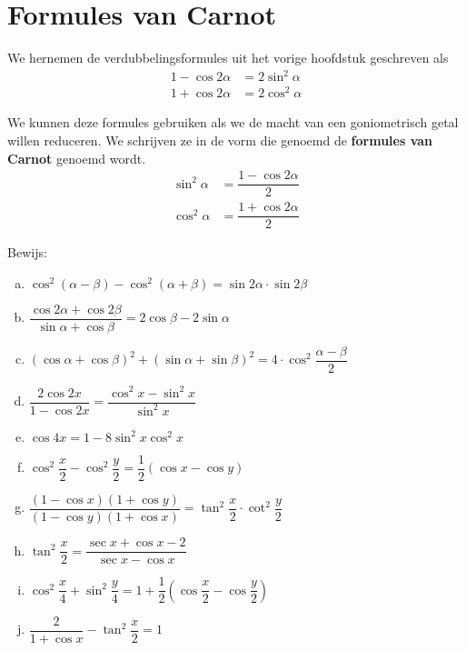 \documentclass[twoside,a4paper,12pt]{article}
\begin{document}
\cleardoublepage
\section{Formules van Carnot}

We hernemen de verdubbelingsformules uit het vorige hoofdstuk geschreven als
\begin{align*}
  1 - \cos 2\alpha &= 2\sin^2\alpha\\
  1 + \cos 2\alpha &= 2\cos^2\alpha
\end{align*}

We kunnen deze formules gebruiken als we de macht van een goniometrisch getal willen reduceren. We schrijven ze in de vorm die genoemd de {\bf formules van Carnot} genoemd wordt.
\begin{align*}
  \sin^2\alpha &= \dfrac{1 - \cos 2\alpha}{2}\\
  \cos^2\alpha &= \dfrac{1 + \cos 2\alpha}{2}
\end{align*}

\begin{oefening} %
Bewijs:
\begin{enumerate}[(a)]
  \itemsep.8em
  \item $\displaystyle \cos^2(\alpha - \beta) - \cos^2(\alpha + \beta) = \sin 2\alpha \cdot \sin 2\beta$
  \item $\displaystyle \dfrac{\cos 2\alpha + \cos 2\beta}{\sin\alpha + \cos\beta} = 2\cos\beta - 2\sin\alpha$
  \item $\displaystyle (\cos\alpha + \cos\beta)^2 + (\sin\alpha + \sin\beta)^2 = 4\cdot\cos^2\dfrac{\alpha-\beta}{2}$
  \item $\displaystyle \dfrac{2\cos 2x}{1-\cos 2x} = \dfrac{\cos^2 x - \sin^2 x}{\sin^2 x}$
  \item $\displaystyle \cos 4x = 1 - 8\sin^2 x \cos^2 x$
  \item $\displaystyle \cos^2 \dfrac{x}{2} - \cos^2 \dfrac{y}{2} = \dfrac{1}{2}\left(\cos x - \cos y \right)$
  \item $\displaystyle \dfrac{(1 - \cos x)(1 + \cos y)}{(1 - \cos y)(1 + \cos x)} = \tan^2 \dfrac{x}{2} \cdot \cot^2 \dfrac{y}{2}$
  \item $\displaystyle \tan^2 \dfrac{x}{2} = \dfrac{\sec x + \cos x - 2}{\sec x - \cos x}$
  \item $\displaystyle \cos^2 \dfrac{x}{4} + \sin^2 \dfrac{y}{4} = 1 + \dfrac{1}{2}\left( \cos \dfrac{x}{2} - \cos \dfrac{y}{2} \right)$
  \item $\displaystyle \dfrac{2}{1 + \cos x} - \tan^2 \dfrac{x}{2} = 1$
\end{enumerate}
\end{oefening}
\end{document}
